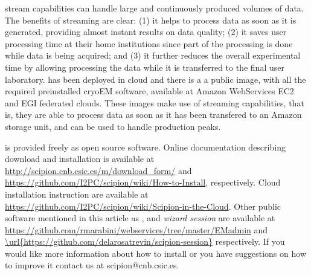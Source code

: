  \scipion stream capabilities can handle large and continuously produced volumes of data. The benefits of streaming are clear: (1) it helps to process data as soon as it is generated,  providing almost instant results on data quality; (2) it saves user processing time at their home institutions since part of the processing is done while data is being acquired; and (3) 
 it further reduces the overall experimental time by allowing processing the data while it is transferred to the final user laboratory. \scipion has been deployed in cloud and there is a  a public image, with all the required preinstalled cryoEM software,  available at Amazon WebServices EC2 and EGI federated clouds. These images make use of \scipion streaming capabilities, that is, they are able to process data as soon as it has been transfered to an Amazon storage unit, and can be used to handle  production peaks.
 
 
\scipion is provided 
freely as open source software. Online documentation
describing \scipion download and installation is available
at \url{http://scipion.cnb.csic.es/m/download_form/} and \url{https://github.com/I2PC/scipion/wiki/How-to-Install}, respectively. Cloud installation instruction are available at \url{https://github.com/I2PC/scipion/wiki/Scipion-in-the-Cloud}. Other public software mentioned in this article as \emadmin, \emadmin and \emph{wizard session} are available at \url{https://github.com/rmarabini/webservices/tree/master/EMadmin} and \url{\url{https://github.com/delarosatrevin/scipion-session}} respectively.
If you would like more information about how to install \scipion or you have suggestions on how to improve it contact us at scipion@cnb.csic.es.






